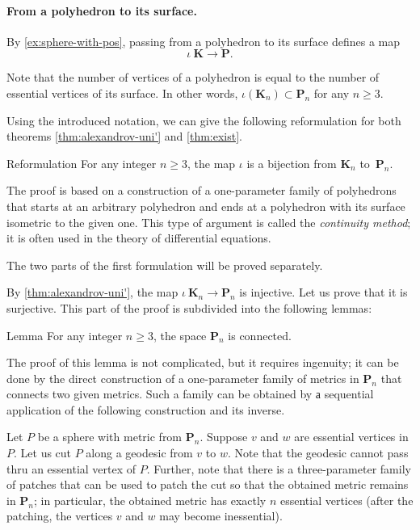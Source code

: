 \paragraph{From a polyhedron to its surface.}

By \ref{ex:sphere-with-pos}, passing from a polyhedron to its surface defines a map
\[\iota\:\mathbf{K}\to \mathbf{P}.\]

Note that the number of vertices of a polyhedron is equal to the number of essential vertices of its surface.
In other words, $\iota(\mathbf{K}_n)\subset \mathbf{P}_n$ for any $n\ge 3$.

Using the introduced notation, we can give the following reformulation for both theorems \ref{thm:alexandrov-uni'} and \ref{thm:exist}.

\begin{thm}{Reformulation}
For any integer $n\ge 3$,
the map $\iota$ is a bijection from $\mathbf{K}_n$ to~$\mathbf{P}_n$.
\end{thm}

The proof is based on a construction of a one-parameter family of polyhedrons that starts at an arbitrary polyhedron
and ends at a polyhedron with its surface isometric to the given one.
This type of argument is called the \emph{continuity method}; it is often used in the theory of differential equations.

\medskip

The two parts of the first formulation will be proved separately.

By \ref{thm:alexandrov-uni'}, the map $\iota\:\mathbf{K}_n\to\mathbf{P}_n$ is injective.
Let us prove that it is surjective.
This part of the proof is subdivided into the following lemmas:

\begin{thm}{Lemma}
For any integer $n\ge 3$, the space $\mathbf{P}_n$ is connected.
\end{thm}

The proof of this lemma is not complicated, but it requires ingenuity;
it can be done by the direct construction of a one-parameter family of metrics in $\mathbf{P}_n$ that connects two given metrics.
Such a family can be obtained by а sequential application of the following construction and its inverse.

Let $P$ be a sphere with metric from $\mathbf{P}_n$.
Suppose $v$ and $w$ are essential vertices in $P$.
Let us cut $P$ along a geodesic from $v$ to $w$.
Note that the geodesic cannot pass thru an essential vertex of $P$.
Further, note that there is a three-parameter family of patches that can be used to patch the cut so that the obtained metric remains in $\mathbf{P}_n$;
in particular, the obtained metric has exactly $n$ essential vertices (after the patching, the vertices $v$ and $w$ may become inessential).


